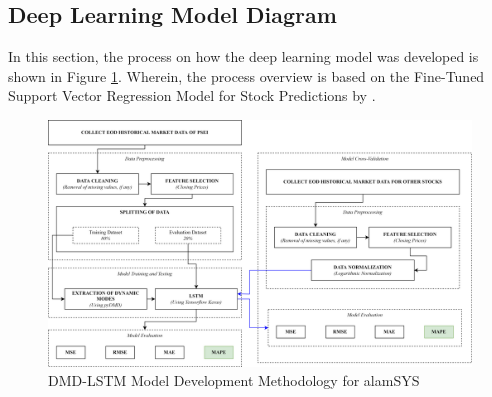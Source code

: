 \subsection{Deep Learning Model Diagram}
\label{subsec:ml_diagram}
In this section, the process on how the deep learning model 
was developed is shown in Figure \ref{fig:ml_model}. 
Wherein, the process overview is based on the Fine-Tuned Support 
Vector Regression Model for Stock Predictions by 
.
\begin{figure}[ht]
    \centering
    \includegraphics[width=1\textwidth]{./assets/Chapter_3/Machine Learning Model.png}
    \caption{DMD-LSTM Model Development Methodology for alamSYS}
    \label{fig:ml_model}
\end{figure}
\FloatBarrier   

